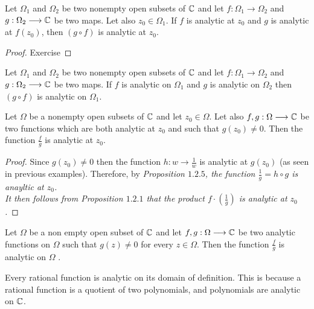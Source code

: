  \begin{proposition}
    Let $\Omega_{1} $ and $\Omega _{2} $ be two 
    nonempty open subsets of $\mathbb{C}  $ and 
    let
    $ f : \Omega _{1} \longrightarrow \Omega _{2} $ and 
    $ g : \Omega _{2} \longrightarrow \mathbb{C}  $ 
    be two maps. Let also $z_0 \in  \Omega _{1} $. If $f $ is analytic
    at $z_0 $ and $g $ is analytic at $f(z_0)  $, then $(g \circ f)  $ 
    is analytic at $z_0$. 
  \end{proposition}
  \begin{proof}
  Exercise 
  \end{proof}
  \begin{corollary}[Immediate]
    Let $\Omega_{1} $ and $\Omega _{2} $ be two 
    nonempty open subsets of $\mathbb{C}  $ and let $ f : \Omega _{1} \longrightarrow  \Omega _{2}$ 
    and $ g : \Omega _{2} \longrightarrow \mathbb{C}  $ be two maps. If $f $ is analytic
    on $\Omega _{1} $ and $g $ is analytic on $\Omega _{2} $ then $(g \circ f)  $ is analytic
    on $\Omega _{1} $. 
  \end{corollary}
  \begin{proposition}
    Let $\Omega  $ be a nonempty open subsets of $\mathbb{C}  $ and let $z_0 \in  \Omega  $. Let 
    also $ f,g : \Omega  \longrightarrow \mathbb{C}  $ be two functions which are both analytic at $z_0 $ 
    and such that $ g(z_0) \neq 0 $. Then the function $\frac{f}{g} $ is analytic at $z_0 $.
  \end{proposition}
  \begin{proof}
  Since $g(z_0) \neq 0 $ then the function $ h : w \longrightarrow \frac{1}{w} $ is analytic at $g(z_0)  $
  (as seen in previous examples). Therefore, by \it Proposition $1.2.5$\normalfont, the function $\frac{1}{g} = h \circ g $ is 
  anayltic at $z_0 $. \\
  It then follows from \it Proposition $1.2.1 $ \normalfont that the product $f \cdot \left( \frac{1}{g} \right)  $ is analytic
  at $z_0 $.
  \end{proof}
  \begin{corollary}[Immediate]
    Let $\Omega  $ be a non empty open subset of $\mathbb{C}  $ and let $ f,g : \Omega  \longrightarrow \mathbb{C}  $ be
    two analytic functions on $\Omega  $ such that $g(z) \neq 0 $ for every $z \in   \Omega $. Then the
    function $\frac{f}{g} $ is analytic on $\Omega  $ .
  \end{corollary}
  \begin{example}
    Every rational function is analytic on its domain of definition. This is because a rational
    function is a quotient of two polynomials, and polynomials are analytic on $\mathbb{C}  $.
  \end{example}
  \divider
